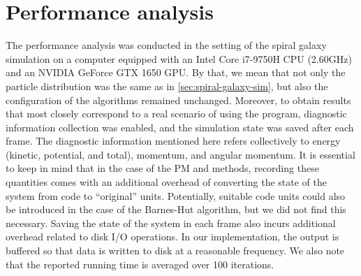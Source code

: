 \section{Performance analysis}
The performance analysis was conducted in the setting of the spiral galaxy simulation on a computer equipped with an Intel Core i7-9750H CPU (2.60GHz) and an NVIDIA GeForce GTX 1650 GPU.
By that, we mean that not only the particle distribution was the same as in \autoref{sec:spiral-galaxy-sim}, but also the configuration of the algorithms remained unchanged.
Moreover, to obtain results that most closely correspond to a real scenario of using the program, diagnostic information collection was enabled, and the simulation state was saved after each frame.
The diagnostic information mentioned here refers collectively to energy (kinetic, potential, and total), momentum, and angular momentum.
It is essential to keep in mind that in the case of the PM and \PThreeM{} methods, recording these quantities comes with an additional overhead of converting the state of the system from code to ``original'' units.
Potentially, suitable code units could also be introduced in the case of the Barnes-Hut algorithm, but we did not find this necessary.
Saving the state of the system in each frame also incurs additional overhead related to disk I/O operations.
In our implementation, the output is buffered so that data is written to disk at a reasonable frequency.
We also note that the reported running time is averaged over 100 iterations.

